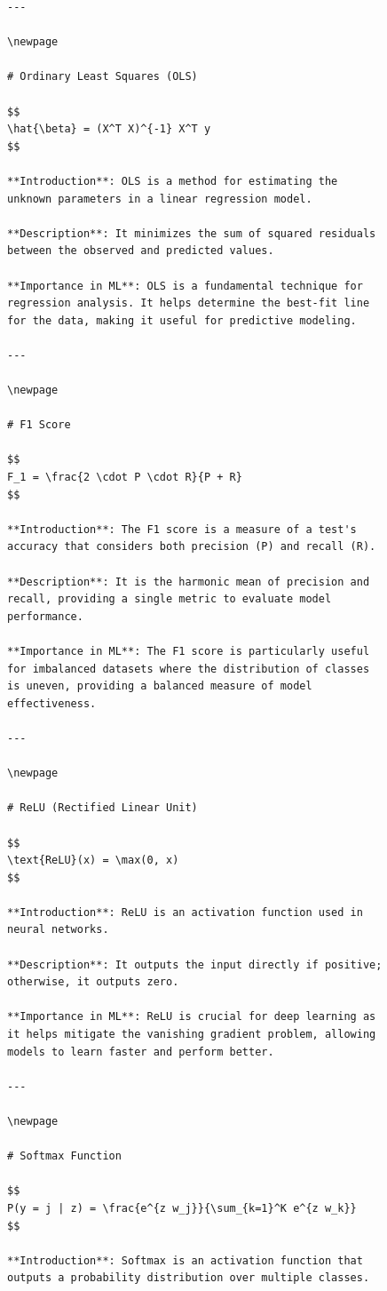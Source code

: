 \documentclass[
  12 pt,
  a4paper,
]{book}
\numberwithin{equation}{section}
\theoremstyle{plain}      %
\theoremstyle{definition} %
\theoremstyle{remark}     %
\theoremstyle{note}         %
\begin{document}
\begin{figure}
\begin{verbatim}
---

\newpage

# Ordinary Least Squares (OLS)

$$
\hat{\beta} = (X^T X)^{-1} X^T y
$$

**Introduction**: OLS is a method for estimating the unknown parameters in a linear regression model.

**Description**: It minimizes the sum of squared residuals between the observed and predicted values.

**Importance in ML**: OLS is a fundamental technique for regression analysis. It helps determine the best-fit line for the data, making it useful for predictive modeling.

---

\newpage

# F1 Score

$$
F_1 = \frac{2 \cdot P \cdot R}{P + R}
$$

**Introduction**: The F1 score is a measure of a test's accuracy that considers both precision (P) and recall (R).

**Description**: It is the harmonic mean of precision and recall, providing a single metric to evaluate model performance.

**Importance in ML**: The F1 score is particularly useful for imbalanced datasets where the distribution of classes is uneven, providing a balanced measure of model effectiveness.

---

\newpage

# ReLU (Rectified Linear Unit)

$$
\text{ReLU}(x) = \max(0, x)
$$

**Introduction**: ReLU is an activation function used in neural networks.

**Description**: It outputs the input directly if positive; otherwise, it outputs zero.

**Importance in ML**: ReLU is crucial for deep learning as it helps mitigate the vanishing gradient problem, allowing models to learn faster and perform better.

---

\newpage

# Softmax Function

$$
P(y = j | z) = \frac{e^{z w_j}}{\sum_{k=1}^K e^{z w_k}}
$$

**Introduction**: Softmax is an activation function that outputs a probability distribution over multiple classes.


\end{verbatim}
\end{figure}
\end{document}
